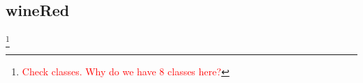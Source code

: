 \subsection{wineRed}\footnote{\textcolor{red}{Check classes. Why do we have 8 classes here?}}






%

